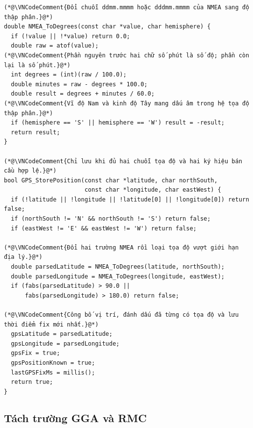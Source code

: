 \documentclass[12pt]{article}
\begin{document}
\begin{lstlisting}[style=firmware,caption={Đổi tọa độ NMEA và lưu vị trí sau khi kiểm tra miền}]
(*@\VNCodeComment{Đổi chuỗi ddmm.mmmm hoặc dddmm.mmmm của NMEA sang độ thập phân.}@*)
double NMEA_ToDegrees(const char *value, char hemisphere) {
  if (!value || !*value) return 0.0;
  double raw = atof(value);
(*@\VNCodeComment{Phần nguyên trước hai chữ số phút là số độ; phần còn lại là số phút.}@*)
  int degrees = (int)(raw / 100.0);
  double minutes = raw - degrees * 100.0;
  double result = degrees + minutes / 60.0;
(*@\VNCodeComment{Vĩ độ Nam và kinh độ Tây mang dấu âm trong hệ tọa độ thập phân.}@*)
  if (hemisphere == 'S' || hemisphere == 'W') result = -result;
  return result;
}

(*@\VNCodeComment{Chỉ lưu khi đủ hai chuỗi tọa độ và hai ký hiệu bán cầu hợp lệ.}@*)
bool GPS_StorePosition(const char *latitude, char northSouth,
                       const char *longitude, char eastWest) {
  if (!latitude || !longitude || !latitude[0] || !longitude[0]) return false;
  if (northSouth != 'N' && northSouth != 'S') return false;
  if (eastWest != 'E' && eastWest != 'W') return false;

(*@\VNCodeComment{Đổi hai trường NMEA rồi loại tọa độ vượt giới hạn địa lý.}@*)
  double parsedLatitude = NMEA_ToDegrees(latitude, northSouth);
  double parsedLongitude = NMEA_ToDegrees(longitude, eastWest);
  if (fabs(parsedLatitude) > 90.0 ||
      fabs(parsedLongitude) > 180.0) return false;

(*@\VNCodeComment{Công bố vị trí, đánh dấu đã từng có tọa độ và lưu thời điểm fix mới nhất.}@*)
  gpsLatitude = parsedLatitude;
  gpsLongitude = parsedLongitude;
  gpsFix = true;
  gpsPositionKnown = true;
  lastGPSFixMs = millis();
  return true;
}
\end{lstlisting}

\subsection{Tách trường GGA và RMC}
\end{document}
